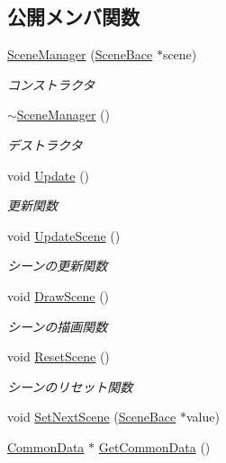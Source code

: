 \subsection*{公開メンバ関数}
\begin{DoxyCompactItemize}
\item 
\mbox{\hyperlink{class_scene_manager_a6096310b39a1f6eb29f993d7bd3d5735}{Scene\+Manager}} (\mbox{\hyperlink{class_scene_bace}{Scene\+Bace}} $\ast$scene)
\begin{DoxyCompactList}\small\item\em コンストラクタ \end{DoxyCompactList}\item 
\mbox{\hyperlink{class_scene_manager_a2bb376a85d29e85f47753e26c7539229}{$\sim$\+Scene\+Manager}} ()
\begin{DoxyCompactList}\small\item\em デストラクタ \end{DoxyCompactList}\item 
void \mbox{\hyperlink{class_scene_manager_a63dcf65832d6a2c190bf496d9a3b00a3}{Update}} ()
\begin{DoxyCompactList}\small\item\em 更新関数 \end{DoxyCompactList}\item 
void \mbox{\hyperlink{class_scene_manager_a493bc0d65558ce004f6f248a185ba956}{Update\+Scene}} ()
\begin{DoxyCompactList}\small\item\em シーンの更新関数 \end{DoxyCompactList}\item 
void \mbox{\hyperlink{class_scene_manager_a828b35826f757b8af34aa767c6b40378}{Draw\+Scene}} ()
\begin{DoxyCompactList}\small\item\em シーンの描画関数 \end{DoxyCompactList}\item 
void \mbox{\hyperlink{class_scene_manager_a1759161a38025ec8212dc98439fd7335}{Reset\+Scene}} ()
\begin{DoxyCompactList}\small\item\em シーンのリセット関数 \end{DoxyCompactList}\item 
void \mbox{\hyperlink{class_scene_manager_ae01f4773bdbb6bf4159f0f5ab193b558}{Set\+Next\+Scene}} (\mbox{\hyperlink{class_scene_bace}{Scene\+Bace}} $\ast$value)
\item 
\mbox{\hyperlink{class_scene_manager_1_1_common_data}{Common\+Data}} $\ast$ \mbox{\hyperlink{class_scene_manager_ad2fb33bb5ff645427353d7085c8be8d4}{Get\+Common\+Data}} ()

\end{DoxyCompactItemize}
